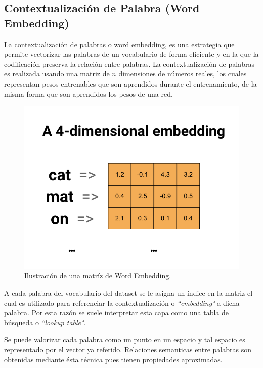\documentclass[12pt, letterpaper]{article}
\begin{document}
    \subsection{Contextualización de Palabra (Word Embedding)}
    La contextualización de palabras o word embedding, es una estrategia que permite vectorizar las palabras de un vocabulario de forma eficiente y en la que la codificación preserva la relación entre palabras. La contextualización de palabras es realizada usando una matriz de $n$ dimensiones de números reales, los cuales representan pesos entrenables que son aprendidos durante el entrenamiento, de la misma forma que son aprendidos los pesos de una red. 
    
    \begin{figure}[H]
        \centering
        \includegraphics[width=0.8\linewidth]{img/4dim_embedding2.png}
        \caption{Ilustración de una matríz de Word Embedding.}
    \end{figure}
    A cada palabra del vocabulario del dataset se le asigna un índice en la matriz el cual es utilizado para referenciar la contextualización o \emph{“embedding"} a dicha palabra. Por esta razón se suele interpretar esta capa como una tabla de búsqueda o \emph{“lookup table"}\cite{tf_wb}.
    
Se puede valorizar cada palabra como un punto en un espacio y tal espacio es representado por el vector ya referido. Relaciones semanticas entre palabras son obtenidas mediante ésta técnica pues tienen propiedades aproximadas.
    
\end{document}
